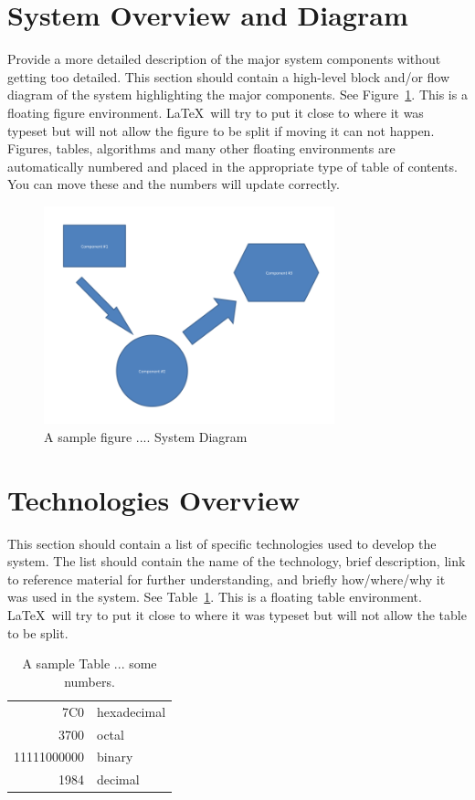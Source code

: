 \section{System Overview and Diagram}
Provide a more detailed description of the major system components
without getting too detailed.  This section should contain a
high-level block and/or flow diagram of the system highlighting the
major components.  See Figure~\ref{systemdiagram}.  This is a floating
figure environment.  \LaTeX\ will try to put it close to where it was
typeset but will not allow the figure to be split if moving it can not
happen.  Figures, tables, algorithms and many other floating
environments are automatically numbered and placed in the appropriate
type of table of contents.  You can move these and the numbers will
update correctly.

\begin{figure}[tbh]
\begin{center}
\includegraphics[width=0.75\textwidth]{./diagram}
\end{center}
\caption{A sample figure .... System Diagram \label{systemdiagram}}
\end{figure}

\section{Technologies Overview}
This section should contain a list of specific technologies used to
develop the system.  The list should contain the name of the
technology, brief description, link to reference material for further
understanding, and briefly how/where/why it was used in the system.
See Table~\ref{somenumbers}.  This is a floating table environment.
\LaTeX\ will try to put it close to where it was typeset but will not
allow the table to be split.

\begin{table}[tbh]
\caption{A sample Table ... some numbers. \label{somenumbers}}
\begin{center}
\begin{tabular}{|r|l|}
  \hline
  7C0 & hexadecimal \\
  3700 & octal \\ \cline{2-2}
  11111000000 & binary \\
  \hline \hline
  1984 & decimal \\
  \hline
\end{tabular}
\end{center}
\end{table}

